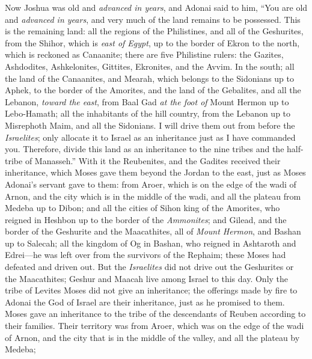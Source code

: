 \begin{biblechapter} %
 Now Joshua was old and \textit{advanced in years}, and Adonai said to him, “You are old and \textit{advanced in years}, and very much of the land remains to be possessed.
\verse This is the remaining land: all the regions of the Philistines, and all of the Geshurites,
\verse from the Shihor, which is \textit{east of Egypt}, up to the border of Ekron to the north, which is reckoned as Canaanite; there are five Philistine rulers: the Gazites, Ashdodites, Ashkelonites, Gittites, Ekronites, and the Avvim.
\verse In the south; all the land of the Canaanites, and Mearah, which belongs to the Sidonians up to Aphek, to the border of the Amorites,
\verse and the land of the Gebalites, and all the Lebanon, \textit{toward the east}, from Baal Gad \textit{at the foot of} Mount Hermon up to Lebo-Hamath;
\verse all the inhabitants of the hill country, from the Lebanon up to Misrephoth Maim, and all the Sidonians. I will drive them out from before the \textit{Israelites}; only allocate it to Israel as an inheritance just as I have commanded you.
\verse Therefore, divide this land as an inheritance to the nine tribes and the half-tribe of Manasseh.”
\verse With it the Reubenites, and the Gadites received their inheritance, which Moses gave them beyond the Jordan to the east, just as Moses Adonai’s servant gave to them:
\verse from Aroer, which is on the edge of the wadi of Arnon, and the city which is in the middle of the wadi, and all the plateau from Medeba up to Dibon;
\verse and all the cities of Sihon king of the Amorites, who reigned in Heshbon up to the border of the \textit{Ammonites};
\verse and Gilead, and the border of the Geshurite and the Maacathites, all of \textit{Mount Hermon}, and Bashan up to Salecah;
\verse all the kingdom of Og in Bashan, who reigned in Ashtaroth and Edrei—he was left over from the survivors of the Rephaim; these Moses had defeated and driven out.
\verse But the \textit{Israelites} did not drive out the Geshurites or the Maacathites; Geshur and Maacah live among Israel to this day.
\verse Only the tribe of Levites Moses did not give an inheritance; the offerings made by fire to Adonai the God of Israel are their inheritance, just as he promised to them.
 Moses gave an inheritance to the tribe of the descendants of Reuben according to their families.
\verse Their territory was from Aroer, which was on the edge of the wadi of Arnon, and the city that is in the middle of the valley, and all the plateau by Medeba;

\end{biblechapter}
